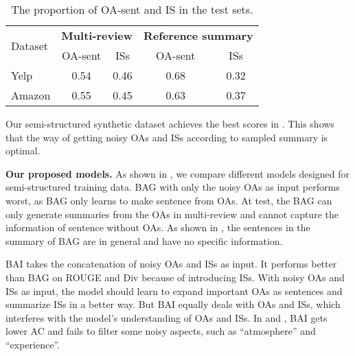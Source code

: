 \begin{table}[th]
	\scriptsize
	\centering
	\begin{tabular}{|l|c|c|c|c|}
		\hline
		\multirow{2}{*}{Dataset}&\multicolumn{2}{c|}{\textbf{Multi-review}}&\multicolumn{2}{c|}{\textbf{Reference summary}} \\ \cline{2-5}
		&OA-sent & ISs & OA-sent & ISs \\
		\hline
		Yelp & 0.54& 0.46&0.68 &0.32\\
		\hline
		Amazon &  0.55&0.45&0.63&0.37\\
		\hline
	\end{tabular}
	\caption{The proportion of OA-sent and IS in the test sets.}
	\label{tab:OAIS}
\end{table}



Our semi-structured synthetic dataset
achieves the best scores in . This shows that
the way of getting noisy OAs and ISs according to sampled summary 
is optimal.



\textbf{Our proposed models.}
As shown in ,
we compare different models designed for semi-structured training data.
BAG with only the noisy OAs as input performs worst,
as BAG %
only learns to make sentence from OAs. At test, the BAG can only generate summaries
from the OAs in multi-review and cannot capture the information of sentence without OAs.
As shown in , the sentences in the summary of BAG 
are in general and have no specific information.

BAI 
takes the concatenation of noisy OAs and ISs as input.
It 
performs better than BAG on ROUGE and Div 
because of introducing ISs.
With noisy OAs and ISs as input, the model should learn to expand important OAs as sentences and summarize ISs in a better way.
But BAI equally deals with OAs and ISs,
which interferes with the model's understanding of OAs and ISs.
In  and ,
BAI gets lower AC and fails to filter some noisy aspects, such as ``atmosphere'' and ``experience''.

